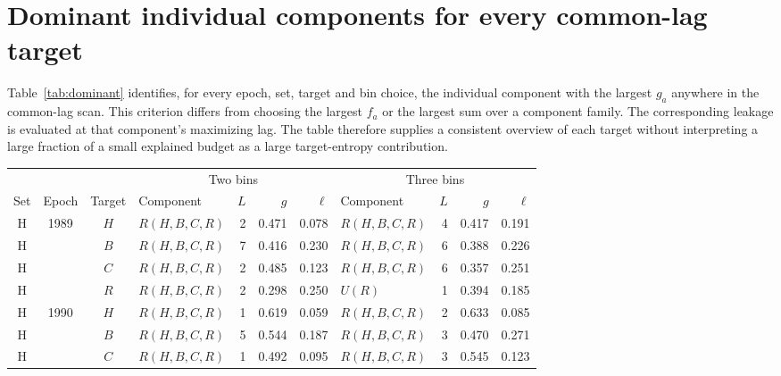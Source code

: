 \documentclass[fleqn,usenatbib]{mnras}
\begin{document}
\section{Dominant individual components for every common-lag target}
\label{app:dominant}
Table~\ref{tab:dominant} identifies, for every epoch, set, target and bin choice, the individual component with the largest $g_a$ anywhere in the common-lag scan. This criterion differs from choosing the largest $f_a$ or the largest sum over a component family. The corresponding leakage is evaluated at that component's maximizing lag. The table therefore supplies a consistent overview of each target without interpreting a large fraction of a small explained budget as a large target-entropy contribution.
\begin{minipage}{\textwidth}\makeatletter\let\@makecaption\SFB@maketablecaption\makeatother
\centering
{}
\label{tab:dominant}
\footnotesize
\begin{tabular}{ccclrrrlrrr}
\toprule
& & & \multicolumn{4}{c}{Two bins} & \multicolumn{4}{c}{Three bins} \\ \cmidrule(lr){4-7}\cmidrule(lr){8-11} Set & Epoch & Target & Component & $L$ & $g$ & $\ell$ & Component & $L$ & $g$ & $\ell$ \\
\midrule
H & 1989 & $H$ & $R(H,B,C,R)$ & 2 & 0.471 & 0.078 & $R(H,B,C,R)$ & 4 & 0.417 & 0.191 \\
H &  & $B$ & $R(H,B,C,R)$ & 7 & 0.416 & 0.230 & $R(H,B,C,R)$ & 6 & 0.388 & 0.226 \\
H &  & $C$ & $R(H,B,C,R)$ & 2 & 0.485 & 0.123 & $R(H,B,C,R)$ & 6 & 0.357 & 0.251 \\
H &  & $R$ & $R(H,B,C,R)$ & 2 & 0.298 & 0.250 & $U(R)$ & 1 & 0.394 & 0.185 \\
\addlinespace[2pt]
H & 1990 & $H$ & $R(H,B,C,R)$ & 1 & 0.619 & 0.059 & $R(H,B,C,R)$ & 2 & 0.633 & 0.085 \\
H &  & $B$ & $R(H,B,C,R)$ & 5 & 0.544 & 0.187 & $R(H,B,C,R)$ & 3 & 0.470 & 0.271 \\
H &  & $C$ & $R(H,B,C,R)$ & 1 & 0.492 & 0.095 & $R(H,B,C,R)$ & 3 & 0.545 & 0.123 \\

\end{tabular}
\end{minipage}
\end{document}
